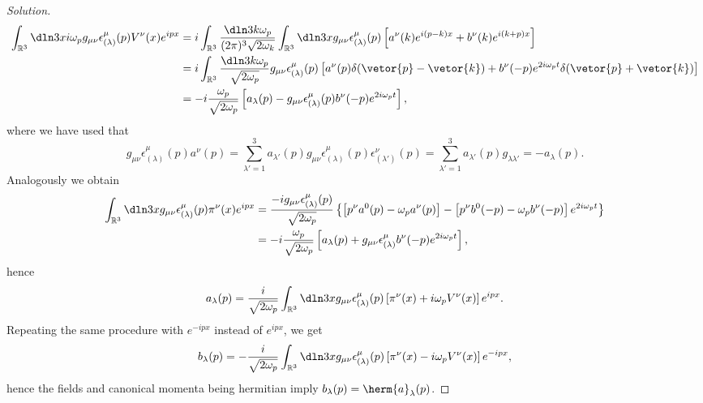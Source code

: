\begin{proof}[Solution]
   \begin{align*}
      \int_{\mathbb{R}^3} \dln3x i \omega_p g_{\mu\nu} \epsilon^\mu_{(\lambda)}(p) V^\nu(x)e^{ipx} 
      &= i\int_{\mathbb{R}^3} \frac{\dln3k \omega_p}{(2\pi)^3\sqrt{2 \omega_k}} \int_{\mathbb{R}^3} \dln3x g_{\mu\nu} \epsilon^\mu_{(\lambda)}(p) \left[a^\nu(k) e^{i(p-k)x} + b^\nu(k) e^{i(k+p)x}\right]\\
      &= i\int_{\mathbb{R}^3} \frac{\dln3k \omega_p}{\sqrt{2\omega_p}} g_{\mu\nu} \epsilon^\mu_{(\lambda)}(p) \left[a^\nu(p) \delta(\vetor{p} - \vetor{k}) + b^\nu(-p)e^{2i \omega_p t} \delta(\vetor{p} + \vetor{k})\right]\\
      &= -i\frac{\omega_p}{\sqrt{2 \omega_p}}\left[a_{\lambda}(p) - g_{\mu\nu} \epsilon^\mu_{(\lambda)}(p) b^\nu(-p) e^{2i \omega_p t}\right],
   \end{align*}
   where we have used that
   \begin{equation*}
      g_{\mu\nu} \epsilon^\mu_{(\lambda)}(p) a^\nu(p) = \sum_{\lambda' = 1}^3 a_{\lambda'}(p) g_{\mu\nu}\epsilon_{(\lambda)}^\mu(p)\epsilon^\nu_{(\lambda')}(p) = \sum_{\lambda' = 1}^3 a_{\lambda'}(p) g_{\lambda \lambda'} = - a_{\lambda}(p).
   \end{equation*}
   Analogously we obtain
   \begin{align*}
      \int_{\mathbb{R}^3} \dln3x g_{\mu\nu} \epsilon_{(\lambda)}^\mu(p) \pi^\nu(x) e^{ipx}
      &= \frac{-i g_{\mu\nu} \epsilon^{\mu}_{(\lambda)}(p)}{\sqrt{2 \omega_p}} \left\{\left[p^\nu a^0(p) - \omega_p a^\nu(p)\right] - \left[p^\nu b^{0}(-p) - \omega_p b^\nu(-p)\right] e^{2i\omega_p t}\right\}\\
      &= -i \frac{\omega_p}{\sqrt{2\omega_p}} \left[a_{\lambda}(p) + g_{\mu\nu} \epsilon^\mu_{(\lambda)} b^{\nu}(-p) e^{2i \omega_p t}\right],
   \end{align*}
   hence
   \begin{equation*}
      a_{\lambda}(p) = \frac{i}{\sqrt{2\omega_p}}\int_{\mathbb{R}^3} \dln3x g_{\mu\nu} \epsilon_{(\lambda)}^\mu(p) \left[\pi^\nu(x) + i\omega_p V^\nu(x)\right] e^{ipx}.
   \end{equation*}
   Repeating the same procedure with \(e^{-ipx}\) instead of \(e^{ipx}\), we get
   \begin{equation*}
      b_\lambda(p) = -\frac{i}{\sqrt{2\omega_p}}\int_{\mathbb{R}^3} \dln3x g_{\mu\nu} \epsilon_{(\lambda)}^\mu(p) \left[\pi^\nu(x) - i\omega_p V^\nu(x)\right] e^{-ipx},
   \end{equation*}
   hence the fields and canonical momenta being hermitian imply \(b_\lambda(p) = \herm{a}_\lambda(p)\). 


\end{proof}
